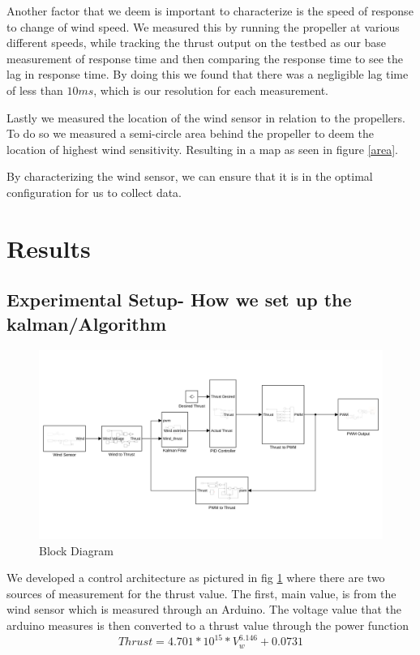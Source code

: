 \documentclass[twocolumn]{article}
\begin{document}
	Another factor that we deem is important to characterize is the speed of response to change of wind speed. We measured this by running the propeller at various different speeds, while tracking the thrust output on the testbed as our base measurement of response time and then comparing the response time to see the lag in response time. By doing this we found that there was a negligible lag time of less than $10 ms$, which is our resolution for each measurement.
	 
	Lastly we measured the location of the wind sensor in relation to the propellers. To do so we measured a semi-circle area behind the propeller to deem the location of highest wind sensitivity. Resulting in a map as seen in figure \ref{area}. 
	
	By characterizing the wind sensor, we can ensure that it is in the optimal configuration for us to collect data.
	
	\section{Results}
	
	\subsection{Experimental Setup- How we set up the kalman/Algorithm}
	\begin{figure}[b]
		\includegraphics[width=\textwidth]{block_diagram}
		\caption{Block Diagram}
		\label{block_diagram}
	\end{figure}

	We developed a control architecture as pictured in fig \ref{block_diagram} where there are two sources of measurement for the thrust value. The first, main value, is from the wind sensor which is measured through an Arduino. The voltage value that the arduino measures is then converted to a thrust value through the power function
	\begin{equation}
	Thrust = 4.701 * 10^{15} * V_w^{6.146} + 0.0731
	\label{wind_power}
	\end{equation}
	
\end{document}
